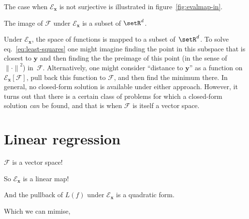 \documentclass[10pt, a4paper]{article}
\begin{document}
The case when $\mathcal{E}_{\bm{x}}$ is not surjective is illustrated in
figure~\ref{fig:evalmap-in}.
\begin{marginfigure}
  \begin{center}
  \end{center}
  \caption{The image of $\mathcal{F}$ under $\mathcal{E}_{\bm{x}}$ is a subset of
    $\setR^d$.\label{fig:evalmap-in}}
\end{marginfigure}
Under $\mathcal{E}_{\bm{x}}$, the space of functions is mapped to a subset
of~$\setR^d$. To solve eq.~\eqref{eq:least-squares} one might imagine
finding the point in this subspace that is closest to $\bm{y}$ and
then finding the the preimage of this point (in the sense of
${\lVert\cdot\rVert}^2$) in~$\mathcal{F}$. Alternatively, one might consider
“distance to $\bm{y}$” as a function on
$\mathcal{E}_{\bm{x}}[\mathcal{F}]$, pull back this function to
$\mathcal{F}$, and then find the minimum there. In general, no closed-form
solution is available under either approach. However, it turns out
that there is a certain class of problems for which a closed-form
solution \emph{can} be found, and that is when $\mathcal{F}$ is itself a vector
space.

\section{Linear regression}



$\mathcal{F}$ is a vector space!

So $\mathcal{E}_{\bm{x}}$ is a linear map!

And the pullback of $L(f)$ under $\mathcal{E}_{\bm{x}}$ is a quadratic form.

Which we can mimise,
\end{document}
